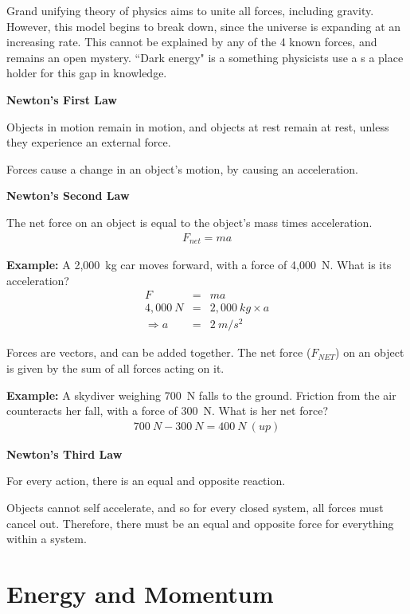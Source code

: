\documentclass[12pt]{article}
\begin{document}
Grand unifying theory of physics aims to unite all forces, including gravity. However, this model begins to break down, since the universe is expanding at an increasing rate. This cannot be explained by any of the 4 known forces, and remains an open mystery. ``Dark energy" is a something physicists use a s a place holder for this gap in knowledge.

\clearpage
\textbf{Newton's First Law}

Objects in motion remain in motion, and objects at rest remain at rest, unless they experience an external force. 

Forces cause a change in an object's motion, by causing an acceleration.

\textbf{Newton's Second Law}

The net force on an object is equal to the object's mass times acceleration.
\begin{eqnarray}
	F_{net} = m a \nonumber
\end{eqnarray}

\textbf{Example:} A 2,000~kg car moves forward, with a force of 4,000~N. What is its acceleration?
\begin{eqnarray}
F &=& m a \nonumber \\
4,000~N &=& 2,000~kg \times a \nonumber  \\
\Rightarrow a &=& 2~m/s^2 \nonumber
\end{eqnarray}

Forces are vectors, and can be added together. The net force ($F_{NET}$) on an object is given by the sum of all forces acting on it.

\textbf{Example:} A skydiver weighing 700~N falls to the ground. Friction from the air counteracts her fall, with a force of 300~N. What is her net force?
\begin{eqnarray}
	700~N - 300~N = 400~N~(up) \nonumber
\end{eqnarray}


\textbf{Newton's Third Law}

For every action, there is an equal and opposite reaction.

Objects cannot self accelerate, and so for every closed system, all forces must cancel out. Therefore, there must be an equal and opposite force for everything within a system.

\clearpage

\section{Energy and Momentum}
\end{document}
